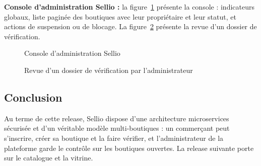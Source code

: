\textbf{Console d'administration Sellio :} la figure~\ref{fig:ui-console} présente la console : indicateurs globaux, liste paginée des boutiques avec leur propriétaire et leur statut, et actions de suspension ou de blocage. La figure~\ref{fig:ui-verif} présente la revue d'un dossier de vérification.
\begin{figure}[H]
    \centering
    \caption{Console d'administration Sellio}
    \label{fig:ui-console}
\end{figure}
\begin{figure}[H]
    \centering
    \caption{Revue d'un dossier de vérification par l'administrateur}
    \label{fig:ui-verif}
\end{figure}

\subsection*{Conclusion}
Au terme de cette release, Sellio dispose d'une architecture microservices sécurisée et d'un véritable modèle multi-boutiques : un commerçant peut s'inscrire, créer sa boutique et la faire vérifier, et l'administrateur de la plateforme garde le contrôle sur les boutiques ouvertes. La release suivante porte sur le catalogue et la vitrine.

